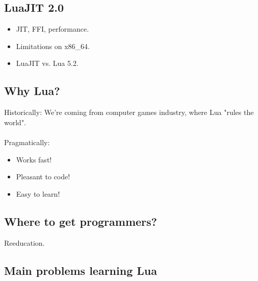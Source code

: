 \documentclass[aspectratio=169,handout,bigger]{beamer}
\begin{document}

\subsection*{LuaJIT 2.0}

\begin{frame}
  \begin{itemize}
    \item JIT, FFI, performance.
    \item Limitations on x86\_64.
    \item LuaJIT vs. Lua 5.2.
  \end{itemize}
\end{frame}


\subsection*{Why Lua?}

\begin{frame}
  Historically: We're coming from computer games industry, where Lua "rules the world".
  \\~\\
  Pragmatically:
  \begin{itemize}
    \item Works fast!
    \item Pleasant to code!
    \item Easy to learn!
  \end{itemize}
\end{frame}


\subsection*{Where to get programmers?}

\begin{frame}
  \begin{center}
    Reeducation.
  \end{center}
\end{frame}


\subsection*{Main problems learning Lua}
\end{document}
